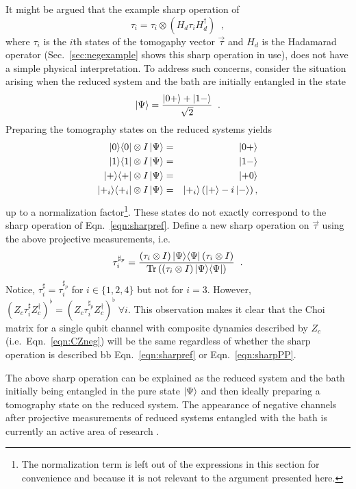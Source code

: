 It might be argued that the example sharp operation of 
\begin{equation}
\label{eqn:sharpref}
\tau_i = \tau_i\otimes \left(H_d\tau_i H_d^\dagger \right)\;\;,
\end{equation}
where $\tau_i$ is the $i$th states of the tomogaphy vector $\vec{\tau}$ and $H_d$ is the Hadamarad operator (Sec.\ \ref{sec:negexample} shows this sharp operation in use), does not have a simple physical interpretation.  To address such concerns, consider the situation arising when the reduced system and the bath are initially entangled in the state
$$
\left|\Psi\right\rangle = \frac{\left|0+\right\rangle+\left|1-\right\rangle}{\sqrt{2}}\;\;.
$$
Preparing the tomography states on the reduced systems yields
\begin{eqnarray*}
|0\rangle\langle0|\otimes I\left|\Psi\right\rangle &=& \left|0+\right\rangle\\
|1\rangle\langle1|\otimes I\left|\Psi\right\rangle &=& \left|1-\right\rangle\\
|+\rangle\langle+|\otimes I\left|\Psi\right\rangle &=& \left|+0\right\rangle\\
|+_i\rangle\langle+_i|\otimes I\left|\Psi\right\rangle &=& \left|+_i\right\rangle\left(\left|+\right\rangle-i\left|-\right\rangle\right),
\end{eqnarray*}
up to a normalization factor\footnote{The normalization term is left out of the expressions in this section for convenience and because it is not relevant to the argument presented here.}.  These states do not exactly correspond to the sharp operation of Eqn.\ \ref{eqn:sharpref}.  Define a new sharp operation on $\vec{\tau}$ using the above projective measurements, i.e.\
\begin{equation}
\label{eqn:sharpPP}
\tau_i^{\sharp_p} = \frac{\left(\tau_i\otimes I\right) |\Psi\rangle\langle\Psi| \left(\tau_i\otimes I\right)}{\operatorname{Tr}{\left(\left(\tau_i\otimes I\right)|\Psi\rangle\langle\Psi|\right)}}\;\;.
\end{equation}
Notice, $\tau_i^\sharp=\tau_i^{\sharp_p}$ for $i\in\{1,2,4\}$ but not for $i=3$.  However, $\left(Z_c\tau_{i}^\sharp Z_c^\dagger\right)^\flat = \left(Z_c\tau_{i}^{\sharp_p} Z_c^\dagger\right)^\flat\;\forall i$.  This observation makes it clear that the Choi matrix for a single qubit channel with composite dynamics described by $Z_c$ (i.e.\ Eqn.\ \ref{eqn:CZneg}) will be the same regardless of whether the sharp operation is described bb Eqn.\ \ref{eqn:sharpref} or Eqn.\ \ref{eqn:sharpPP}.

The above sharp operation can be explained as the reduced system and the bath initially being entangled in the pure state $\left|\Psi\right\rangle$ and then ideally preparing a tomography state on the reduced system.  The appearance of negative channels after projective measurements of reduced systems entangled with the bath is currently an active area of research \cite{Devi2011}.

